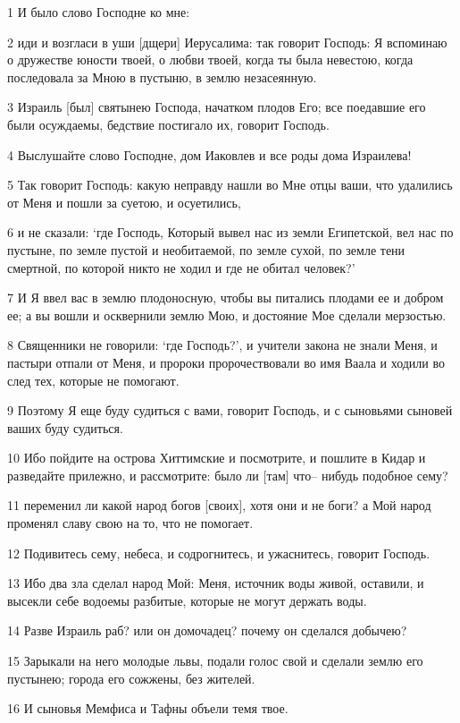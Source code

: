\par 1 И было слово Господне ко мне:
\par 2 иди и возгласи в уши [дщери] Иерусалима: так говорит Господь: Я вспоминаю о дружестве юности твоей, о любви твоей, когда ты была невестою, когда последовала за Мною в пустыню, в землю незасеянную.
\par 3 Израиль [был] святынею Господа, начатком плодов Его; все поедавшие его были осуждаемы, бедствие постигало их, говорит Господь.
\par 4 Выслушайте слово Господне, дом Иаковлев и все роды дома Израилева!
\par 5 Так говорит Господь: какую неправду нашли во Мне отцы ваши, что удалились от Меня и пошли за суетою, и осуетились,
\par 6 и не сказали: `где Господь, Который вывел нас из земли Египетской, вел нас по пустыне, по земле пустой и необитаемой, по земле сухой, по земле тени смертной, по которой никто не ходил и где не обитал человек?'
\par 7 И Я ввел вас в землю плодоносную, чтобы вы питались плодами ее и добром ее; а вы вошли и осквернили землю Мою, и достояние Мое сделали мерзостью.
\par 8 Священники не говорили: `где Господь?', и учители закона не знали Меня, и пастыри отпали от Меня, и пророки пророчествовали во имя Ваала и ходили во след тех, которые не помогают.
\par 9 Поэтому Я еще буду судиться с вами, говорит Господь, и с сыновьями сыновей ваших буду судиться.
\par 10 Ибо пойдите на острова Хиттимские и посмотрите, и пошлите в Кидар и разведайте прилежно, и рассмотрите: было ли [там] что-- нибудь подобное сему?
\par 11 переменил ли какой народ богов [своих], хотя они и не боги? а Мой народ променял славу свою на то, что не помогает.
\par 12 Подивитесь сему, небеса, и содрогнитесь, и ужаснитесь, говорит Господь.
\par 13 Ибо два зла сделал народ Мой: Меня, источник воды живой, оставили, и высекли себе водоемы разбитые, которые не могут держать воды.
\par 14 Разве Израиль раб? или он домочадец? почему он сделался добычею?
\par 15 Зарыкали на него молодые львы, подали голос свой и сделали землю его пустынею; города его сожжены, без жителей.
\par 16 И сыновья Мемфиса и Тафны объели темя твое.
